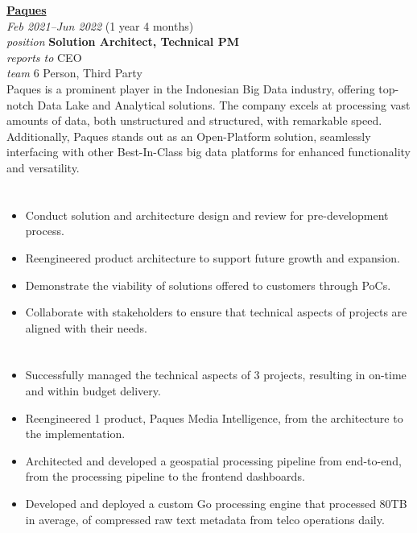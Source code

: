 \documentclass[12pt]{res}
\begin{document}
\begin{resume}
\begin{multicols}{2}
	{\large {\bf \href{https://paques.id}{Paques}}} \\
	{\footnotesize{\sl Feb 2021--Jun 2022} \hfill (1 year 4 months)}\\
	{\footnotesize{\sl position} \hfill \bf{Solution Architect, Technical PM}}\\
	{\footnotesize{\sl reports to} \hfill CEO}\\
	{\footnotesize{\sl team} \hfill 6 Person, Third Party}\\

	\columnbreak
	{\footnotesize{Paques is a prominent player in the Indonesian Big Data industry, offering top-notch Data Lake and Analytical solutions. The company excels at processing vast amounts of data, both unstructured and structured, with remarkable speed. Additionally, Paques stands out as an Open-Platform solution, seamlessly interfacing with other Best-In-Class big data platforms for enhanced functionality and versatility.}}\\
\end{multicols}
\vspace{-20pt}

\begin{multicols}{2}
	\section{}
		\begin{itemize}
			\item Conduct solution and architecture design and review for pre-development process.
\item Reengineered product architecture to support future growth and expansion.
\item Demonstrate the viability of solutions offered to customers through PoCs.
\item Collaborate with stakeholders to ensure that technical aspects of projects are aligned with their needs.
		\end{itemize}
	\section{}
		\begin{itemize}
			\setlength{\itemindent}{0pt}
			\item Successfully managed the technical aspects of 3 projects, resulting in on-time and within budget delivery.
\item Reengineered 1 product, Paques Media Intelligence, from the architecture to the implementation.
\item Architected and developed a geospatial processing pipeline from end-to-end, from the processing pipeline to the frontend dashboards.
\item Developed and deployed a custom Go processing engine that processed 80TB in average, of compressed raw text metadata from telco operations daily.
		\end{itemize}
\end{multicols}


\end{resume}
\end{document}
